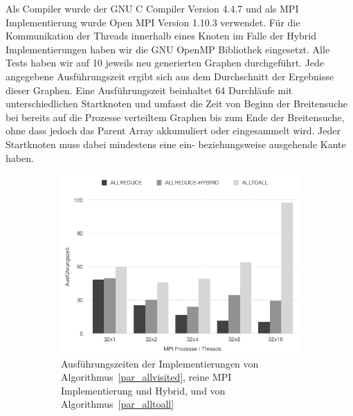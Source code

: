 \documentclass[11pt,a4paper]{article}
\begin{document}
Als Compiler wurde der GNU C Compiler Version 4.4.7 und als MPI Implementierung wurde Open MPI Version 1.10.3 verwendet. Für die Kommunikation der Threads innerhalb eines Knoten im Falle der Hybrid Implementierungen haben wir die GNU OpenMP Bibliothek eingesetzt. Alle Tests haben wir auf 10 jeweils neu generierten Graphen durchgeführt. Jede angegebene Ausführungszeit ergibt sich aus dem Durchschnitt der Ergebnisse dieser Graphen. Eine Ausführungszeit beinhaltet 64 Durchläufe mit unterschiedlichen Startknoten und umfasst die Zeit von Beginn der Breitensuche bei bereits auf die Prozesse verteiltem Graphen bis zum Ende der Breitensuche, ohne dass jedoch das Parent Array akkumuliert oder eingesammelt wird. Jeder Startknoten muss dabei mindestens eine ein- beziehungsweise ausgehende Kante haben.\\
\begin{figure}[t]
	\centering
    \begin{subfigure}[h]{0.48\textwidth}
        \includegraphics[width=1\textwidth]{times_algo1}
        \caption{Ausführungszeiten der Implementierungen von Algorithmus~\ref{par_allvisited}, reine MPI Implementierung und Hybrid, und von Algorithmus~\ref{par_alltoall}}
        \label{fig:times1}
    \end{subfigure}
   \hspace{0em}
    \begin{subfigure}[h]{0.48\textwidth}

\end{subfigure}
\end{figure}
\end{document}
